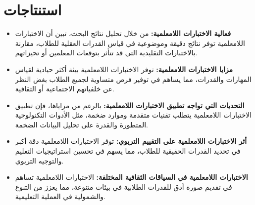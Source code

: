 \chapter*{استنتاجات}

\begin{itemize}
	\item \textbf{فعالية الاختبارات اللامعلمية:} من خلال تحليل نتائج البحث، تبين أن الاختبارات اللامعلمية توفر نتائج دقيقة وموضوعية في قياس القدرات العقلية للطلاب، مقارنة بالاختبارات التقليدية التي قد تتأثر بتوقعات المعلمين أو تحيزاتهم.
	
	\item \textbf{مزايا الاختبارات اللامعلمية:} توفر الاختبارات اللامعلمية بيئة أكثر حيادية لقياس المهارات والقدرات، مما يساهم في توفير فرص متساوية لجميع الطلاب بغض النظر عن خلفياتهم الاجتماعية أو الثقافية.
	
	\item \textbf{التحديات التي تواجه تطبيق الاختبارات اللامعلمية:} بالرغم من مزاياها، فإن تطبيق الاختبارات اللامعلمية يتطلب تقنيات متقدمة وموارد ضخمة، مثل الأدوات التكنولوجية المتطورة والقدرة على تحليل البيانات الضخمة.
	
	\item \textbf{أثر الاختبارات اللامعلمية على التقييم التربوي:} توفر الاختبارات اللامعلمية دقة أكبر في تحديد القدرات الحقيقية للطلاب، مما يسهم في تحسين استراتيجيات التعليم والتوجيه التربوي.
	
	\item \textbf{الاختبارات اللامعلمية في السياقات الثقافية المختلفة:} الاختبارات اللامعلمية تساهم في تقديم صورة أدق للقدرات الطلابية في بيئات متنوعة، مما يعزز من التنوع والشمولية في العملية التعليمية.
\end{itemize}



